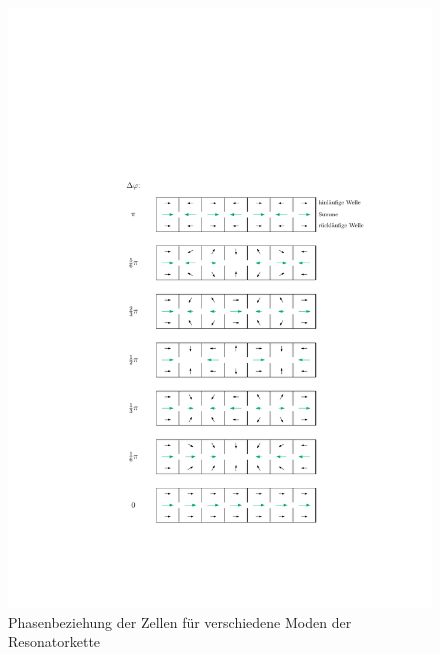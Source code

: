 \begin{figure}[p]
	\centering
	\hspace{2cm} %
	\includegraphics[scale=1.0]{./figs/zellen_phasoren.pdf}
	\caption[Phasenbeziehung]{Phasenbeziehung der Zellen für verschiedene Moden der Resonatorkette}
	\label{fig:phasor}
\end{figure}

